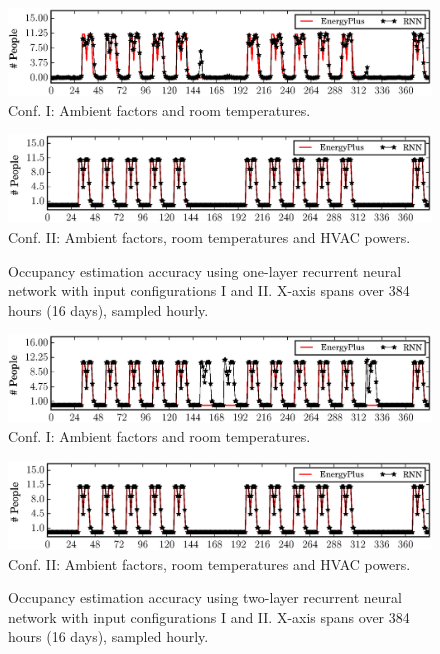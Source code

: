 \begin{figure}[h]
\begin{minipage}{\textwidth}
\centering\includegraphics[width=5in]{figs/results/1LRoomTOnlyDPFAugW3-4}
Conf. I: Ambient factors and room temperatures.
\end{minipage}
\hfill

\vspace{3ex}

\noindent\begin{minipage}{\textwidth}
\centering\includegraphics[width=5in]{figs/results/1LAmbHVACDPFAugW3-4}
Conf. II: Ambient factors, room temperatures and HVAC powers.
\end{minipage}
\hfill
    \caption{Occupancy estimation accuracy using one-layer recurrent neural
    network with input configurations I and II. X-axis
    spans over 384 hours (16 days), sampled hourly.}\label{fig:one-layer}
\end{figure}

\begin{figure}[h]

\begin{minipage}{\textwidth}
\centering\includegraphics[width=5in]{figs/results/2LRoomTOnlyDPFAugW3-4}
Conf. I: Ambient factors and room temperatures.
\end{minipage}
\hfill

\vspace{3ex}

\noindent\begin{minipage}{\textwidth}
\centering\includegraphics[width=5in]{figs/results/2LAmbHVACDPFAugW3-4}
Conf. II: Ambient factors, room temperatures and HVAC powers.
\end{minipage}
\hfill
\caption{Occupancy estimation accuracy using two-layer recurrent neural network
    with input configurations I and II. X-axis spans over
    384 hours (16 days), sampled hourly.}\label{fig:two-layer}
\end{figure}


